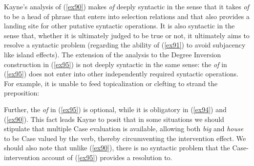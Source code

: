 \documentclass[output=paper,
modfonts
]{LSP/langsci}
\begin{document}
{{{Kayne's analysis of ({\ref{ex90}}) makes {\textit{of}} deeply syntactic in the sense that it takes {\textit{of}} to be a head of phrase that enters into selection relations and that also provides a landing site for other putative syntactic operations.  It is also syntactic in the sense that, whether it is ultimately judged to be true or not, it ultimately aims to resolve a syntactic problem (regarding the ability of ({\ref{ex91}}) to avoid subjacency like island effects).   The extension of the analysis to the Degree Inversion construction in ({\ref{ex95}}) is not deeply syntactic in the same sense:  the {\textit{of}} in ({\ref{ex95}}) does not enter into other independently required syntactic operations.  For example, it is unable to feed topicalization or clefting to strand the preposition:

\begin{exe}
\ex\label{ex98} 
\begin{xlist}
\end{xlist}
\end{exe}
Further, the {\textit{of}} in ({\ref{ex95}}) is optional, while it is obligatory in ({\ref{ex94}}) and ({\ref{ex90}}).  This fact leads Kayne to posit that in some situations we should stipulate that multiple Case evaluation is available, allowing both {\textit{big}} and {\textit{house}} to be Case valued by the verb, thereby circumventing the intervention effect.  We should also note that unlike ({\ref{ex90}}), there is no syntactic problem that the Case-intervention account of ({\ref{ex95}}) provides a resolution to.  

}}}
\end{document}
